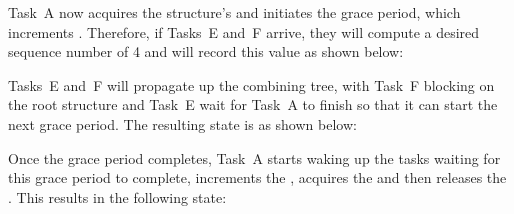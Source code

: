 Task~A now acquires the  structure's  and
initiates the grace period, which increments .
Therefore, if Tasks~E and~F arrive, they will compute a desired sequence
number of 4 and will record this value as shown below:

\begin{center}
\end{center}

Tasks~E and~F will propagate up the  combining tree, with
Task~F blocking on the root  structure and Task~E wait for
Task~A to finish so that it can start the next grace period.
The
resulting state is as shown below:

\begin{center}
\end{center}

Once the grace period completes, Task~A starts waking up the tasks
waiting for this grace period to complete, increments the
, acquires the  and then
releases the .
This results in the following state:

\begin{center}
\end{center}

